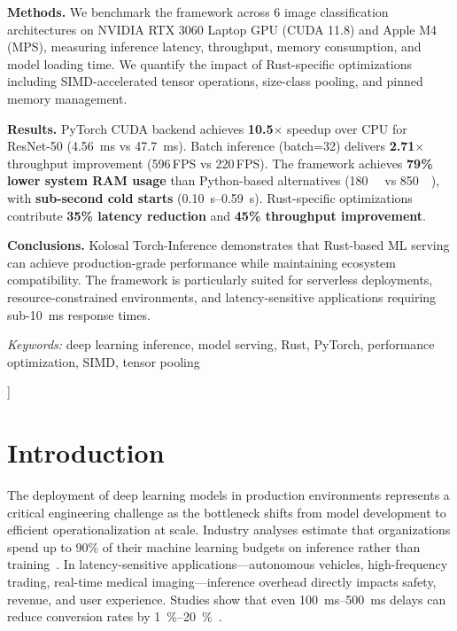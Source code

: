 \documentclass[10pt,twocolumn,a4paper]{article}
\theoremstyle{definition}
\theoremstyle{plain}
\newcommand{\timesX}[1]{#1$\times$}
\newcommand{\fpssuffix}{\,FPS}
\begin{document}
\begin{minipage}{\textwidth}
\vspace{0.2em}
\noindent \textbf{Methods.} We benchmark the framework across 6 image classification architectures on NVIDIA RTX 3060 Laptop GPU (CUDA 11.8) and Apple M4 (MPS), measuring inference latency, throughput, memory consumption, and model loading time. We quantify the impact of Rust-specific optimizations including SIMD-accelerated tensor operations, size-class pooling, and pinned memory management.

\vspace{0.2em}
\noindent \textbf{Results.} PyTorch CUDA backend achieves \textbf{\timesX{10.5}} speedup over CPU for ResNet-50 (\SI{4.56}{\milli\second} vs \SI{47.7}{\milli\second}). Batch inference (batch=32) delivers \textbf{\timesX{2.71}} throughput improvement (\num{596}\fpssuffix{} vs \num{220}\fpssuffix{}). The framework achieves \textbf{79\% lower system RAM usage} than Python-based alternatives (\SI{180}{\mega\byte} vs \SI{850}{\mega\byte}), with \textbf{sub-second cold starts} (\SIrange{0.10}{0.59}{\second}). Rust-specific optimizations contribute \textbf{35\% latency reduction} and \textbf{45\% throughput improvement}.

\vspace{0.2em}
\noindent \textbf{Conclusions.} Kolosal Torch-Inference demonstrates that Rust-based ML serving can achieve production-grade performance while maintaining ecosystem compatibility. The framework is particularly suited for serverless deployments, resource-constrained environments, and latency-sensitive applications requiring sub-\SI{10}{\milli\second} response times.

\vspace{0.4em}
\noindent\textit{Keywords:} deep learning inference, model serving, Rust, PyTorch, performance optimization, SIMD, tensor pooling
\vspace{1em}
\end{minipage}
]

\section{Introduction}

The deployment of deep learning models in production environments represents a critical engineering challenge as the bottleneck shifts from model development to efficient operationalization at scale. Industry analyses estimate that organizations spend up to 90\% of their machine learning budgets on inference rather than training~\citep{patterson2021carbon}. In latency-sensitive applications---autonomous vehicles, high-frequency trading, real-time medical imaging---inference overhead directly impacts safety, revenue, and user experience. Studies show that even \SIrange{100}{500}{\milli\second} delays can reduce conversion rates by \SIrange{1}{20}{\percent}~\citep{amazon2019latency,brutlag2009latency}.
\end{document}
